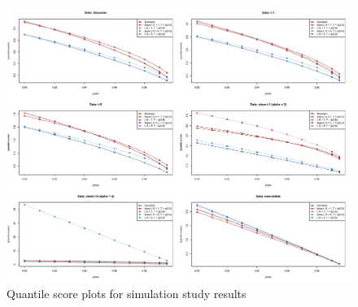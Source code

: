 \documentclass[11pt]{article}
\begin{document}
\begin{figure}
  \includegraphics[width=\linewidth]{plots/quantileplots.pdf}
  \caption{Quantile score plots for simulation study results}
  \label{fig:simquantscores}
\end{figure}
\end{document}
